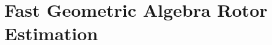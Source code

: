\documentclass{birkjour}
\numberwithin{equation}{section}
\begin{document}

\section{Fast Geometric Algebra Rotor Estimation}
\end{document}
